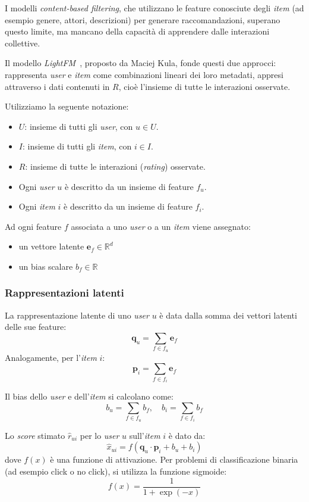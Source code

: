 I modelli \textit{content-based filtering}, che utilizzano le feature conosciute degli \textit{item} (ad esempio genere, attori, descrizioni) per generare raccomandazioni, superano questo limite, ma mancano della capacità di apprendere dalle interazioni collettive.

Il modello \textit{LightFM}~\cite{LightFM}, proposto da Maciej Kula, fonde questi due approcci: rappresenta \textit{user} e \textit{item} come combinazioni lineari dei loro metadati, appresi attraverso i dati contenuti in $R$, cioè l'insieme di tutte le interazioni osservate.

Utilizziamo la seguente notazione:
\begin{itemize}
    \item $U$: insieme di tutti gli \textit{user}, con $u \in U$.
    \item $I$: insieme di tutti gli \textit{item}, con $i \in I$.
    \item $R$: insieme di tutte le interazioni (\textit{rating}) osservate.
    \item Ogni \textit{user} $u$ è descritto da un insieme di feature $f_u$.
    \item Ogni \textit{item} $i$ è descritto da un insieme di feature $f_i$.
\end{itemize}

Ad ogni feature $f$ associata a uno \textit{user} o a un \textit{item} viene assegnato:
\begin{itemize}
    \item un vettore latente $\mathbf{e}_f \in \mathbb{R}^d$
    \item un bias scalare $b_f \in \mathbb{R}$
\end{itemize}

\subsubsection{Rappresentazioni latenti}
La rappresentazione latente di uno \textit{user} $u$ è data dalla somma dei vettori latenti delle sue feature:
\[
\mathbf{q}_u = \sum_{f \in f_u} \mathbf{e}_f
\]
Analogamente, per l'\textit{item} $i$:
\[
\mathbf{p}_i = \sum_{f \in f_i} \mathbf{e}_f
\]

Il bias dello \textit{user} e dell'\textit{item} si calcolano come:
\[
b_u = \sum_{f \in f_u} b_f, \quad b_i = \sum_{f \in f_i} b_f
\]

Lo \textit{score} stimato $\hat{r}_{ui}$ per lo \textit{user} $u$ sull'\textit{item} $i$ è dato da:
\[
\hat{x}_{ui} = f\left( \mathbf{q}_u \cdot \mathbf{p}_i + b_u + b_i \right)
\]
dove $f(x)$ è una funzione di attivazione. Per problemi di classificazione binaria (ad esempio click o no click), si utilizza la funzione sigmoide:
\[
f(x) = \frac{1}{1 + \exp(-x)}
\]

